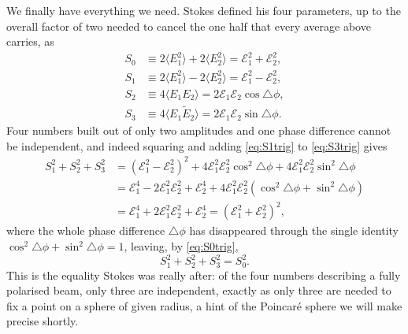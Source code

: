         We finally have everything we need. Stokes defined his four parameters, up to the overall factor of two needed to cancel the one half that every average above carries, as
        \begin{align}
            S_0 &\equiv 2\langle E_1^2\rangle + 2\langle E_2^2\rangle = \mathcal E_1^2+\mathcal E_2^2, \label{eq:S0trig}\\
            S_1 &\equiv 2\langle E_1^2\rangle - 2\langle E_2^2\rangle = \mathcal E_1^2-\mathcal E_2^2, \label{eq:S1trig}\\
            S_2 &\equiv 4\langle E_1E_2\rangle = 2\mathcal E_1\mathcal E_2\cos\triangle\phi, \label{eq:S2trig}\\
            S_3 &\equiv 4\langle E_1\tilde E_2\rangle = 2\mathcal E_1\mathcal E_2\sin\triangle\phi. \label{eq:S3trig}
        \end{align}
        Four numbers built out of only two amplitudes and one phase difference cannot be independent, and indeed squaring and adding \ref{eq:S1trig} to \ref{eq:S3trig} gives
        \begin{align*}
            S_1^2+S_2^2+S_3^2 &= \left(\mathcal E_1^2-\mathcal E_2^2\right)^2 + 4\mathcal E_1^2\mathcal E_2^2\cos^2\triangle\phi + 4\mathcal E_1^2\mathcal E_2^2\sin^2\triangle\phi \\
            &= \mathcal E_1^4 - 2\mathcal E_1^2\mathcal E_2^2 + \mathcal E_2^4 + 4\mathcal E_1^2\mathcal E_2^2\left(\cos^2\triangle\phi+\sin^2\triangle\phi\right) \\
            &= \mathcal E_1^4 + 2\mathcal E_1^2\mathcal E_2^2 + \mathcal E_2^4 = \left(\mathcal E_1^2+\mathcal E_2^2\right)^2,
        \end{align*}
        where the whole phase difference $\triangle\phi$ has disappeared through the single identity $\cos^2\triangle\phi+\sin^2\triangle\phi=1$, leaving, by \ref{eq:S0trig},
        \begin{equation}\label{eq:StokesIdentityTrig}
            S_1^2+S_2^2+S_3^2 = S_0^2.
        \end{equation}
        This is the equality Stokes was really after: of the four numbers describing a fully polarised beam, only three are independent, exactly as only three are needed to fix a point on a sphere of given radius, a hint of the Poincaré sphere we will make precise shortly.

